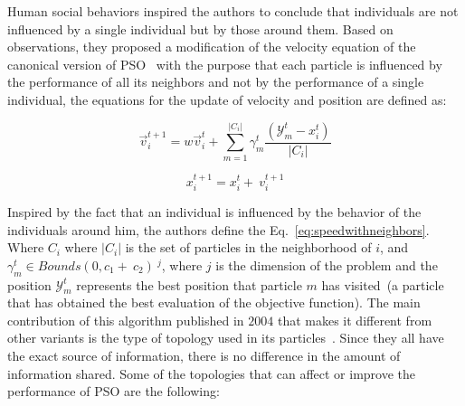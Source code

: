 Human social behaviors inspired the authors to conclude that individuals are not influenced by a single individual but by those around them. Based on observations, they proposed a modification of the velocity equation of the canonical version of PSO~\cite{kennedy1995particle} with the purpose that each particle is influenced by the performance of all its neighbors and not by the performance of a single individual, the equations for the update of velocity and position are defined as: 

\begin{equation}\label{eq:speedwithneighbors}
      \vec{v}_i^{t+1}=w\vec{v}_i^t+\sum_{m=1}^{\left|C_i\right|}{\gamma_m^t\frac{(\mathcal{Y}_m^t-x_i^t)}{\left|C_i\right|}}
\end{equation}

\begin{equation}
       x_i^{t+1}=x_i^t +\ v_i^{t+1}
\end{equation}


Inspired by the fact that an individual is influenced by the behavior of the individuals around him, the authors define the Eq.~\ref{eq:speedwithneighbors}. Where $C_i$ where $\left|C_i\right|$ is the set of particles in the neighborhood of $i$, and $\gamma_m^t\in Bounds(0, c_1+\ c_2)\ ^j$, where $j$ is the dimension of the problem and the position $\mathcal{Y}_m^t$ represents the best position that particle $m$ has visited~(a particle that has obtained the best evaluation of the objective function).
The main contribution of this algorithm published in $2004$ that makes it different from other variants is the type of topology used in its particles~\cite{mendes2004population}. Since they all have the exact source of information, there is no difference in the amount of information shared. Some of the topologies that can affect or improve the performance of PSO are the following:


